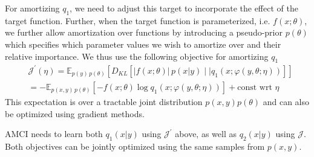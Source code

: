 \documentclass[12pt]{article}
\begin{document}
For amortizing $q_1$, we need to adjust this target to incorporate the effect of the
target function.  Further, when the target function is parameterized, i.e. $f(x;\theta)$,
we further allow amortization over functions by introducing a pseudo-prior $p(\theta)$ which
specifies which parameter values we wish to amortize over and their relative importance.
	We thus use the following objective for amortizing $q_1$
\begin{align}
&\mathcal{J}^{'}(\eta)
=
\mathbb{E}_{p(y)\,p(\theta)}\left[D_{KL} \left[ |f(x;\theta)| \, p(x|y) \mid\mid q_1(x;\varphi(y, \theta; \eta)) \right]\right] 
\nonumber \\
&=
-\mathbb{E}_{p(x,y)\,p(\theta)}\left[-f(x; \theta) \log q_1(x ;\varphi(y, \theta; \eta))\right] + \text{const wrt }\eta
\nonumber
\end{align}
This expectation is over a tractable joint distribution $p(x,y)p(\theta)$ 
and can also be optimized using gradient methods.

AMCI needs to learn both $q_1(x|y)$ using $\mathcal{J}^{'}$ above, 
as well as $q_2(x|y)$ using $\mathcal{J}$.
Both objectives can be jointly optimized using the same samples from $p(x,y)$.
\end{document}
